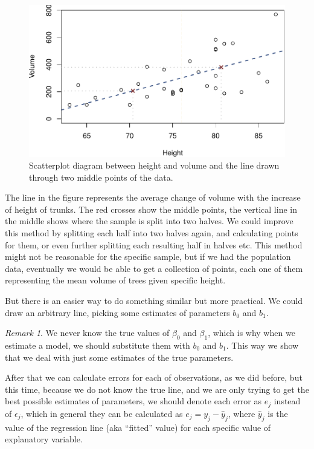 \documentclass[
]{book}
\theoremstyle{definition}
\theoremstyle{definition}
\theoremstyle{definition}
\theoremstyle{definition}
\theoremstyle{remark}
\newtheorem*{remark}{Remark}
\begin{document}
\begin{figure}
\centering
\includegraphics{Svetunkov---Statistics-for-Business-Analytics_files/figure-latex/TreesModelSegments-1.pdf}
\caption{\label{fig:TreesModelSegments}Scatterplot diagram between height and volume and the line drawn through two middle points of the data.}
\end{figure}

The line in the figure represents the average change of volume with the increase of height of trunks. The red crosses show the middle points, the vertical line in the middle shows where the sample is split into two halves. We could improve this method by splitting each half into two halves again, and calculating points for them, or even further splitting each resulting half in halves etc. This method might not be reasonable for the specific sample, but if we had the population data, eventually we would be able to get a collection of points, each one of them representing the mean volume of trees given specific height.

But there is an easier way to do something similar but more practical. We could draw an arbitrary line, picking some estimates of parameters \(b_0\) and \(b_1\).

\begin{remark}
We never know the true values of \(\beta_0\) and \(\beta_1\), which is why when we estimate a model, we should substitute them with \(b_0\) and \(b_1\). This way we show that we deal with just some estimates of the true parameters.
\end{remark}

After that we can calculate errors for each of observations, as we did before, but this time, because we do not know the true line, and we are only trying to get the best possible estimates of parameters, we should denote each error as \(e_j\) instead of \(\epsilon_j\), which in general they can be calculated as \(e_j = y_j - \hat{y}_j\), where \(\hat{y}_j\) is the value of the regression line (aka ``fitted'' value) for each specific value of explanatory variable.
\end{document}
